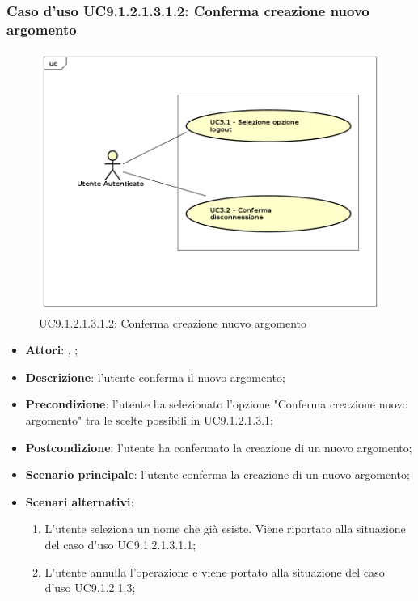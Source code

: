 							\subsubsection{Caso d'uso UC9.1.2.1.3.1.2: Conferma creazione nuovo argomento}
							\label{UC9.1.2.1.3.1.2}
							\begin{figure}[h]
								\centering
								\includegraphics[scale=0.7,keepaspectratio]{UML/UC9.png}
								\caption{UC9.1.2.1.3.1.2: Conferma creazione nuovo argomento}
							\end{figure}
							\FloatBarrier
							\begin{itemize}
								\item \textbf{Attori}: \uau, \uaupro;
								\item \textbf{Descrizione}: l'utente conferma il nuovo argomento;
								\item \textbf{Precondizione}: l'utente ha selezionato l'opzione "Conferma creazione nuovo argomento" tra le scelte possibili in UC9.1.2.1.3.1;
								\item \textbf{Postcondizione}: l'utente ha confermato la creazione di un nuovo argomento;
								\item \textbf{Scenario principale}: l'utente conferma la creazione di un nuovo argomento;
								\item \textbf{Scenari alternativi}: 
									\begin{enumerate}
										\item L'utente seleziona un nome che già esiste. Viene riportato alla situazione del caso d'uso UC9.1.2.1.3.1.1;
										\item L'utente annulla l'operazione e viene portato alla situazione del caso d'uso UC9.1.2.1.3;
									\end{enumerate}
						
							\end{itemize}
						
